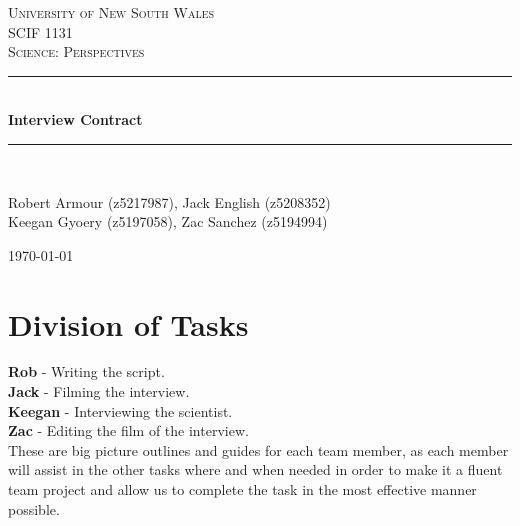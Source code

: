 \documentclass[a4paper]{article}
\begin{document}
\newlength{\strutheight}
\settoheight{\strutheight}{\strut}

\begin{titlepage}

\newcommand{\HRule}{\rule{\linewidth}{0.5mm}} %

\center %
 
\textsc{\LARGE University of New South Wales}\\[1.5cm] %
\textsc{\Large SCIF 1131}\\[0.5cm] %
\textsc{\large Science: Perspectives}\\[0.5cm] %

\HRule \\[0.4cm]
{ \huge \bfseries Interview Contract}\\[0.4cm] %
\HRule \\[1.5cm]


\begin{center} \large
Robert Armour (z5217987), Jack English (z5208352)\\ 
Keegan Gyoery (z5197058), Zac Sanchez (z5194994)%
\\
\end{center}


\vspace{4cm}

{\today}\\[3cm] %

\vfill %

\end{titlepage}


\section{Division of Tasks}
\textbf{Rob} - Writing the script.\\
\textbf{Jack} - Filming the interview.\\
\textbf{Keegan} - Interviewing the scientist.\\
\textbf{Zac} - Editing the film of the interview.\\
These are big picture outlines and guides for each team member, as each member will assist in the other tasks where and when needed in order to make it a fluent team project and allow us to complete the task in the most effective manner possible.\\
\end{document}
